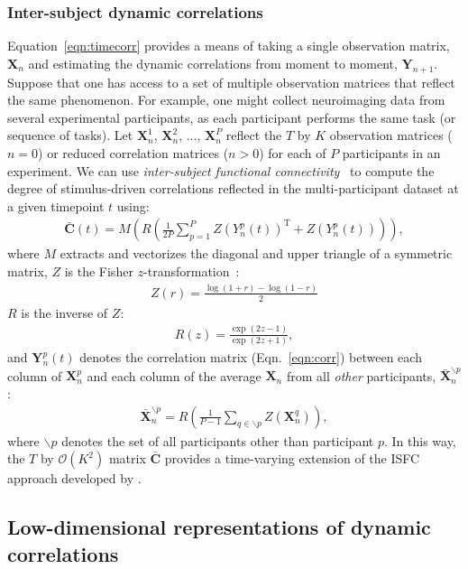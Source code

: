 \documentclass[english]{article}
\begin{document}
\subsubsection*{Inter-subject dynamic correlations}
Equation~\ref{eqn:timecorr} provides a means of taking a single
observation matrix, $\mathbf{X}_n$ and estimating the dynamic
correlations from moment to moment, $\mathbf{Y}_{n+1}$.  Suppose that
one has access to a set of multiple observation matrices that reflect
the same phenomenon.  For example, one might collect neuroimaging data
from several experimental participants, as each participant performs
the same task (or sequence of tasks).  Let $\mathbf{X}_n^1$,
$\mathbf{X}_n^2$, ..., $\mathbf{X}_n^P$ reflect the $T$ by $K$
observation matrices ($n = 0$) or reduced correlation matrices
($n > 0$) for each of $P$ participants in an experiment.  We can use
\textit{inter-subject functional connectivity}~\citep[ISFC;
][]{SimoEtal16} to compute the degree of stimulus-driven correlations
reflected in the multi-participant dataset at a given timepoint $t$
using:
\begin{align}
\bar{\mathbf{C}}(t) = M\left(R\left(\frac{1}{2P} \sum_{p=1}^P
  Z\left(Y_n^p(t)\right)^\mathrm{T} + Z\left(Y_n^p(t)\right)\right)\right),
\end{align}
where $M$ extracts and vectorizes the diagonal and upper triangle of a symmetric
matrix, $Z$ is the Fisher $z$-transformation~\citep{Zar10}:
\begin{align}
Z(r) = \frac{\log(1+r) - \log(1-r)}{2}
\end{align}
$R$ is the inverse of $Z$:
\begin{align}
R(z) = \frac{\exp(2z - 1)}{\exp(2z + 1)},
\end{align}
and $\mathbf{Y}_n^p(t)$ denotes the correlation matrix
(Eqn.~\ref{eqn:corr}) between each column of $\mathbf{X}_n^p$ and each
column of the average $\mathbf{X}_n$ from all \textit{other}
participants, $\bar{\mathbf{X}}_n^{ \backslash p}$:
\begin{align}
  \bar{\mathbf{X}}_n^{ \backslash p} = R\left(\frac{1}{P-1}\sum_{q \in
  \backslash p} Z\left( \mathbf{X}_n^q \right) \right),
\end{align}
where $\backslash p$ denotes the set of all participants other than
participant $p$. In this way, the $T$ by $\mathcal{O}(K^2)$
matrix $\bar{\mathbf{C}}$ provides a time-varying extension of the ISFC
approach developed by \cite{SimoEtal16}.

\subsection*{Low-dimensional representations of dynamic
  correlations}
\end{document}
